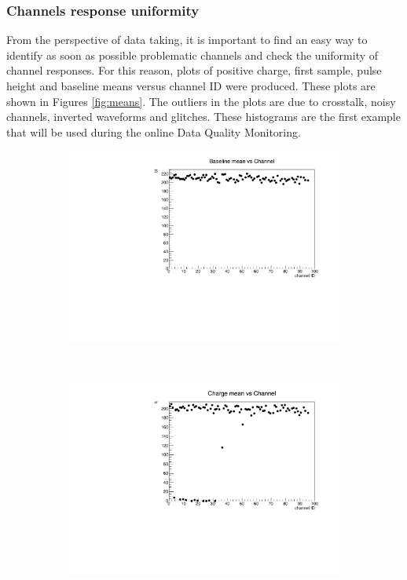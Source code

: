 \subsubsection{Channels response uniformity}
From the perspective of data taking, it is important to 
find an easy way to identify as soon as possible 
problematic channels and check the uniformity of channel responses.
For this reason, plots of positive charge, first sample, 
pulse height and baseline means versus channel ID were produced. 
These plots are shown in Figures \ref{fig:means}. 
The outliers in the plots are due to crosstalk, 
noisy channels, inverted waveforms and glitches. 
These histograms are the first example that will be used during the 
online Data Quality Monitoring.
\begin{figure}[!h]
  \centering
  \begin{subfigure}[t]{0.5\textwidth}
      \centering
      \includegraphics[width=\textwidth]{figures/pdf/bl_vs_ch1.pdf}
      \caption{}
  \end{subfigure}%
  ~ 
  \begin{subfigure}[t]{0.5\textwidth}
      \centering
      \includegraphics[width=\textwidth]{figures/pdf/q_vs_ch1.pdf}

\end{subfigure}
\end{figure}
